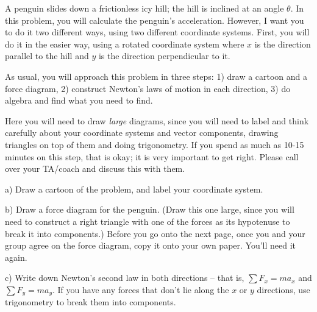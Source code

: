 \documentclass[12pt]{article}
\begin{document}
\Large
\centerline{}
\normalsize
\centerline{}

A penguin slides down a frictionless icy hill; the hill is inclined at an angle $\theta$. In this problem, you will 
calculate the penguin's acceleration. However, I want you to do it two different ways, using two different coordinate systems. First, you will do
it in the easier way, using a rotated coordinate system where $x$ is the direction parallel to the hill and $y$ is the direction perpendicular to it.

As usual, you will approach this problem in three steps: 1) draw a cartoon and a force diagram, 2) construct Newton's laws of motion in each direction, 3) do algebra and find what you need to find. 

Here you will need to draw {\it large} diagrams, since you will need to label and think carefully about your coordinate systems and vector components, drawing triangles on top of them and doing trigonometry. If you spend as much as 10-15 minutes on this step, that is okay; it is very important to get right. Please call over your TA/coach and discuss this with them.



\bigskip

\begin{minipage}{0.4\textwidth}
\begin{center}a) Draw a cartoon of the problem, and label your coordinate system.
\end{center}
\end{minipage}
\hspace{0.05\textwidth}
\begin{minipage}{0.55\textwidth}

	b) Draw a force diagram for the penguin. (Draw this one large, since you will need to construct a right triangle with one of the forces as its hypotenuse to break it into components.) Before you go onto the next page, once you and your group agree on the force diagram, copy it onto your own paper. You'll need it again.


\end{minipage}
\vspace{2in}


\newpage

c) Write down Newton's second law in both directions -- that is, $\sum F_x = ma_x$ and $\sum F_y = ma_y$. If you have any forces that don't lie along the $x$ or $y$ directions, use trigonometry to break them into components.
\end{document}
